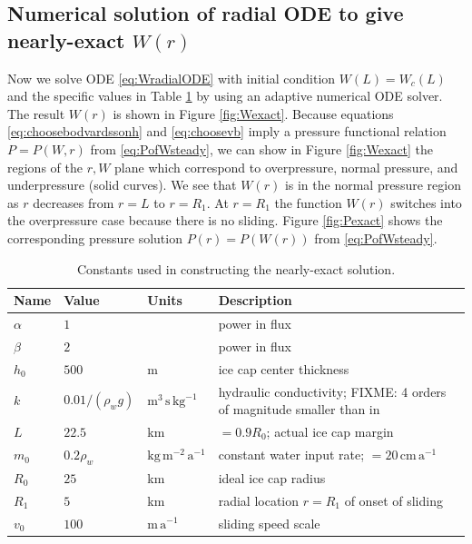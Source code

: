 \documentclass[11pt,final]{amsart}
\begin{document}
\subsection*{Numerical solution of radial ODE to give nearly-exact $W(r)$}  Now we solve ODE \eqref{eq:WradialODE} with initial condition $W(L)=W_c(L)$ and the specific values in Table \ref{tab:verifconstants} by using an adaptive numerical ODE solver.  The result $W(r)$ is shown in Figure \ref{fig:Wexact}.  Because equations \eqref{eq:choosebodvardssonh} and \eqref{eq:choosevb} imply a pressure functional relation $P=P(W,r)$ from \eqref{eq:PofWsteady}, we can show in Figure \ref{fig:Wexact} the regions of the $r,W$ plane which correspond to overpressure, normal pressure, and underpressure (solid curves).  We see that $W(r)$ is in the normal pressure region as $r$ decreases from $r=L$ to $r=R_1$.  At $r=R_1$ the function $W(r)$ switches into the overpressure case because there is no sliding.  Figure \ref{fig:Pexact} shows the corresponding pressure solution $P(r)=P(W(r))$ from \eqref{eq:PofWsteady}.

\begin{table}[ht]
  \centering
  \caption{Constants used in constructing the nearly-exact solution.}
  \begin{tabular}{lllp{3.0in}}
    \textbf{Name} & \textbf{Value} & \textbf{Units} & \textbf{Description}\\
\hline
    $\alpha$ & $1$ & & power in flux \\
    $\beta$  & $2$ & & power in flux \\
    $h_0$ & $500$ & m & ice cap center thickness \\
    $k$   & $0.01/(\rho_w g)$ & $\text{m}^3\,\text{s}\,\text{kg}^{-1}$ & hydraulic conductivity; FIXME: 4 orders of magnitude smaller than in \cite{Hewittetal2012} \\
    $L$   & $22.5$& km & $=0.9 R_0$; actual ice cap margin \\
    $m_0$ & $0.2\rho_w$ & $\text{kg}\,\text{m}^{-2}\,\text{a}^{-1}$ & constant water input rate; $= 20 \,\text{cm}\,\text{a}^{-1}$ \\
    $R_0$ & $25$  & km & ideal ice cap radius \\
    $R_1$ & $5$   & km & radial location $r=R_1$ of onset of sliding \\
    $v_0$ & $100$ & $\text{m}\,\text{a}^{-1}$ & sliding speed scale \\
    \hline
  \end{tabular}
 \label{tab:verifconstants}
\end{table}
\end{document}
